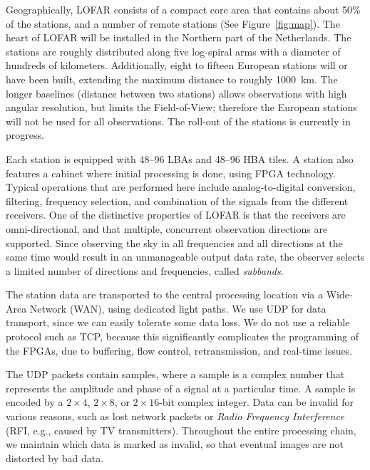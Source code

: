 \documentclass{sig-alternate}
\begin{document}
Geographically, LOFAR consists of a compact core area that contains
about 50\% of the stations, and a number of
remote stations (See Figure~\ref{fig:map}).  The heart of LOFAR will
be installed in the Northern part of the Netherlands.  The stations
are roughly distributed along five log-spiral arms with a diameter of
hundreds of kilometers. 
Additionally, eight to fifteen European stations will or have been built,
extending the maximum distance to roughly 1000~km.
The longer baselines (distance between two stations) allows observations with high angular resolution,
but limits the Field-of-View; therefore the European stations will not be
used for all observations.
The roll-out of the stations is currently in progress.

Each station is equipped with 48--96 LBAs and 48--96 HBA tiles. 
A station also features a cabinet where initial processing is done, using
FPGA technology.
Typical operations that are performed here include analog-to-digital
conversion, filtering, frequency selection, and combination of the signals
from the different receivers.
One of the distinctive properties of LOFAR is that the receivers are
omni-directional, and that multiple, concurrent observation directions are
supported.
Since observing the sky in all frequencies and all directions at the same time
would result in an unmanageable output data rate, the observer selects a
limited number of directions and frequencies, called \emph{subbands}.

The station data are transported to the central processing location 
via a Wide-Area Network (WAN), using dedicated light paths.
We use UDP for data transport, since we can easily tolerate some data loss.
We do not use a reliable protocol such as TCP, because this significantly
complicates the programming of the FPGAs, due to buffering, flow control,
retransmission, and real-time issues.

The UDP packets contain samples, where a sample is a complex number
that represents the amplitude and phase of a signal at a particular
time.  A sample is encoded by a $2\times4$, $2\times8$, or $2\times16$-bit
complex integer. Data can be invalid for various reasons, such as
lost network packets or \emph{Radio Frequency Interference\/} (RFI, e.g.,
caused by TV transmitters).
Throughout the entire processing chain, we maintain which
data is marked as invalid, so that eventual images are not distorted by
bad data.  
\end{document}
